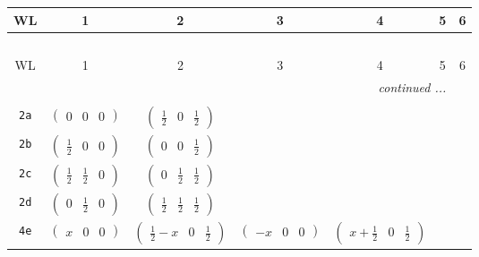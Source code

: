 \documentclass[fleqn,9pt,landscape]{jsarticle}
\begin{document}
\begin{center}
\renewcommand{\arraystretch}{1.2}
\begin{longtable}{ccccccc}
 \hline \hline
WL & 1 & 2 & 3 & 4 & 5 & 6 \\ \hline \endfirsthead

\multicolumn{6}{l}{\tablename\ \thetable{}} \\
 \hline \hline
WL & 1 & 2 & 3 & 4 & 5 & 6 \\ \hline \endhead

 \hline \hline
\multicolumn{6}{r}{\footnotesize\it continued ...} \\ \endfoot

 \hline \hline
\multicolumn{6}{r}{} \\ \endlastfoot

{\tt 2a} & $ \begin{pmatrix} 0 & 0 & 0 \end{pmatrix} $ & $ \begin{pmatrix} \frac{1}{2} & 0 & \frac{1}{2} \end{pmatrix} $ & $  $ & $  $ & $  $ & $  $ \\ \hline
{\tt 2b} & $ \begin{pmatrix} \frac{1}{2} & 0 & 0 \end{pmatrix} $ & $ \begin{pmatrix} 0 & 0 & \frac{1}{2} \end{pmatrix} $ & $  $ & $  $ & $  $ & $  $ \\ \hline
{\tt 2c} & $ \begin{pmatrix} \frac{1}{2} & \frac{1}{2} & 0 \end{pmatrix} $ & $ \begin{pmatrix} 0 & \frac{1}{2} & \frac{1}{2} \end{pmatrix} $ & $  $ & $  $ & $  $ & $  $ \\ \hline
{\tt 2d} & $ \begin{pmatrix} 0 & \frac{1}{2} & 0 \end{pmatrix} $ & $ \begin{pmatrix} \frac{1}{2} & \frac{1}{2} & \frac{1}{2} \end{pmatrix} $ & $  $ & $  $ & $  $ & $  $ \\ \hline
{\tt 4e} & $ \begin{pmatrix} x & 0 & 0 \end{pmatrix} $ & $ \begin{pmatrix} \frac{1}{2} - x & 0 & \frac{1}{2} \end{pmatrix} $ & $ \begin{pmatrix} - x & 0 & 0 \end{pmatrix} $ & $ \begin{pmatrix} x + \frac{1}{2} & 0 & \frac{1}{2} \end{pmatrix} $ & $  $ & $  $ \\ \hline

\end{longtable}
\end{center}
\end{document}

